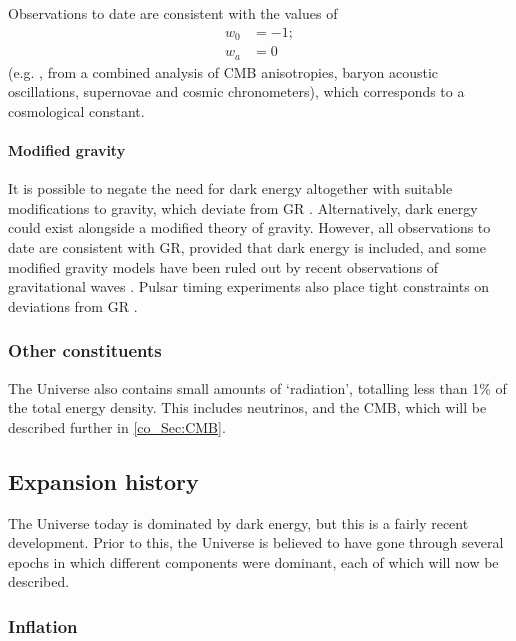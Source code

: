 Observations to date are consistent with the values of
\begin{align}
w_0 &= -1; \\
w_a &= 0
\end{align}
(e.g. \cite{Ribeiro2019}, from a combined analysis of CMB anisotropies, baryon acoustic oscillations, supernovae and cosmic chronometers), which corresponds to a cosmological constant.

\paragraph{Modified gravity}

It is possible to negate the need for dark energy altogether with suitable modifications to gravity, which deviate from GR \citep[e.g.][]{Nojiri2003, Nojiri2011, Nicolis2009, Clifton2012, Nojiri2017}. Alternatively, dark energy could exist alongside a modified theory of gravity. However, all observations to date are consistent with GR, provided that dark energy is included, and some modified gravity models have been ruled out by recent observations of gravitational waves \citep{Blas2016, Vainio2017, Arai2018, Battye2018, Ma2019}. Pulsar timing experiments also place tight constraints on deviations from GR \citep{BeltranJimenez2016, Shao2017, Cai2019, Kramer2021}.

\subsubsection{Other constituents}

The Universe also contains small amounts of `radiation', totalling less than 1\% of the total energy density. This includes neutrinos, and the CMB, which will be described further in \autoref{co_Sec:CMB}.

\subsection{Expansion history}
\label{co_Sec:expansion_history}

The Universe today is dominated by dark energy, but this is a fairly recent development. Prior to this, the Universe is believed to have gone through several epochs in which different components were dominant, each of which will now be described.

\subsubsection{Inflation}

